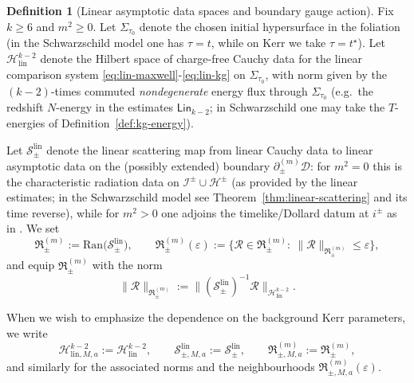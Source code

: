 \documentclass[11pt]{article}
\numberwithin{equation}{section}
\theoremstyle{plain}
\theoremstyle{definition}
\newtheorem{definition}{Definition}[section]
\theoremstyle{remark}
\newcommand{\D}{\mathcal{D}}
\newcommand{\Lin}{\mathsf{Lin}}
\begin{document}
\begin{definition}[Linear asymptotic data spaces and boundary gauge action]\label{def:linear-asymptotic-spaces}
Fix $k\ge 6$ and $m^{2}\ge 0$.
Let $\Sigma_{\tau_{0}}$ denote the chosen initial hypersurface in the foliation (in the Schwarzschild model one has $\tau=t$, while on Kerr we take $\tau=t^{\star}$). Let $\mathcal H_{\mathrm{lin}}^{k-2}$ denote the Hilbert space of charge-free Cauchy data for the linear comparison system \eqref{eq:lin-maxwell}-\eqref{eq:lin-kg} on $\Sigma_{\tau_{0}}$, with norm given by the $(k-2)$-times commuted \emph{nondegenerate} energy flux through $\Sigma_{\tau_{0}}$ (e.g.\ the redshift $N$-energy in the estimates $\Lin_{k-2}$; in Schwarzschild one may take the $T$-energies of Definition~\ref{def:kg-energy}).

Let $\mathscr S_{\pm}^{\mathrm{lin}}$ denote the linear scattering map from linear Cauchy data to linear asymptotic data on the (possibly extended) boundary $\partial_{\pm}^{(m)}\D$:
for $m^{2}=0$ this is the characteristic radiation data on $\mathcal I^{\pm}\cup\mathcal H^{\pm}$ (as provided by the linear estimates; in the Schwarzschild model see Theorem~\ref{thm:linear-scattering} and its time reverse), while for $m^{2}>0$ one adjoins the timelike/Dollard datum at $i^{\pm}$ as in \cite{Dimock,BachelotKG}.
We set
\begin{equation}
\mathfrak R_{\pm}^{(m)}:=\mathrm{Ran}\bigl(\mathscr S_{\pm}^{\mathrm{lin}}\bigr),
\qquad
\mathfrak R_{\pm}^{(m)}(\varepsilon):=\bigl\{\mathcal R\in\mathfrak R_{\pm}^{(m)}:\ \|\mathcal R\|_{\mathfrak R_{\pm}^{(m)}}\le \varepsilon\bigr\},
\end{equation}
and equip $\mathfrak R_{\pm}^{(m)}$ with the norm
\begin{equation}
\|\mathcal R\|_{\mathfrak R_{\pm}^{(m)}}:=\bigl\|(\mathscr S_{\pm}^{\mathrm{lin}})^{-1}\mathcal R\bigr\|_{\mathcal H_{\mathrm{lin}}^{k-2}}.
\end{equation}


\medskip
\noindent When we wish to emphasize the dependence on the background Kerr parameters, we write
\begin{equation}
\mathcal H_{\mathrm{lin},M,a}^{k-2}:=\mathcal H_{\mathrm{lin}}^{k-2},\qquad
\mathscr S_{\pm,M,a}^{\mathrm{lin}}:=\mathscr S_{\pm}^{\mathrm{lin}},\qquad
\mathfrak R_{\pm,M,a}^{(m)}:=\mathfrak R_{\pm}^{(m)},
\end{equation}
and similarly for the associated norms and the neighbourhoods $\mathfrak R_{\pm,M,a}^{(m)}(\varepsilon)$.
\end{definition}
\end{document}
